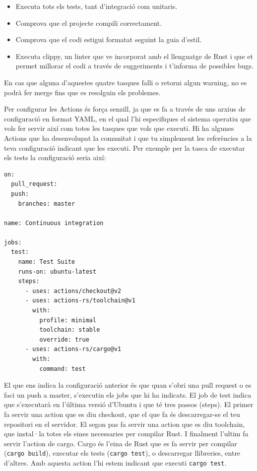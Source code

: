 ﻿\documentclass{article}
\begin{document}
\begin{itemize}
    \item Executa tots els tests, tant d'integració com unitaris.
    \item Comprova que el projecte compili correctament.
    \item Comprova que el codi estigui formatat seguint la guia d'estil.
    \item Executa clippy, un linter que ve incorporat amb el llenguatge de Rust 
        i que et permet millorar el codi a través de suggeriments i t'informa de
        possibles bugs.
\end{itemize}

En cas que alguna d'aquestes quatre tasques falli o retorni algun warning, 
no es podrà fer merge fins que es resolguin els problemes.

Per configurar les Actions és força senzill, ja que es fa a través de uns arxius
de configuració en format YAML, en el qual l'hi especifiques el sistema operatiu
que vols fer servir així com totes les tasques que vols que executi. Hi ha 
algunes Actions que ha desenvolupat la comunitat i que tu simplement les 
referències a la teva configuració indicant que les executi. Per exemple per la
tasca de executar els tests la configuració seria així:

\begin{verbatim}
on:
  pull_request:
  push:
    branches: master

name: Continuous integration

jobs:
  test:
    name: Test Suite
    runs-on: ubuntu-latest
    steps:
      - uses: actions/checkout@v2
      - uses: actions-rs/toolchain@v1
        with:
          profile: minimal
          toolchain: stable
          override: true
      - uses: actions-rs/cargo@v1
        with:
          command: test
\end{verbatim}

El que ens indica la configuració anterior és que quan s'obri una pull request o
es faci un push a master, s'executin els jobs que hi ha indicats. El job de test
indica que s'executarà en l'última versió d'Ubuntu i que té tres passos (steps).
El primer fa servir una action que es diu checkout, que el que fa és
descarregar-se el teu repositori en el servidor. El segon pas fa servir una
action que es diu toolchain, que instal·la totes els eines necessaries per
compilar Rust. I finalment l'ultim fa servir l'action de cargo. Cargo és l'eina
de Rust que es fa servir per compilar (\texttt{cargo build}), executar els tests
(\texttt{cargo test}), o descarregar llibreries, entre d'altres. Amb aquesta
action l'hi estem indicant que executi \texttt{cargo test}.
\end{document}
